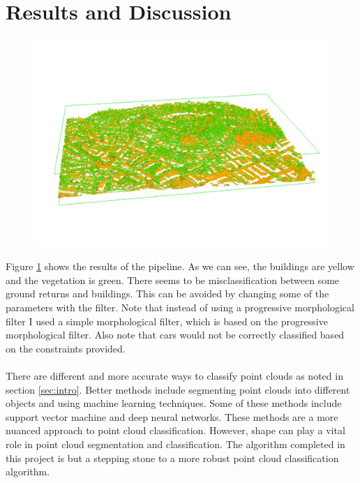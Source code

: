 \documentclass[11pt]{article}
\theoremstyle{definition}
\begin{document}
\section{Results and Discussion}\label{sec:results}

\begin{figure}[h]
	\centering
	\begin{minipage}{.7\textwidth}
		\centering
		\includegraphics[width=.7\linewidth]{output.png}
		\label{fig:output}
	\end{minipage}
\end{figure}
Figure \ref{fig:output} shows the results of the pipeline.  As we can see, the buildings are yellow and the vegetation is green.  There seems to be misclassification between some ground returns and buildings.  This can be avoided by changing some of the parameters with the filter.  Note that instead of using a progressive morphological filter I used a simple morphological filter, which is based on the progressive morphological filter. Also note that cars would not be correctly classified based on the constraints provided.
\\\\
There are different and more accurate ways to classify point clouds as noted in section \ref{sec:intro}.  Better methods include segmenting point clouds into different objects and using machine learning techniques.  Some of these methods include support vector machine and deep neural networks.  These methods are a more nuanced approach to point cloud classification.  However, shape can play a vital role in point cloud segmentation and classification.  The algorithm completed in this project is but a stepping stone to a more robust point cloud classification algorithm.    
\\\\
\end{document}
